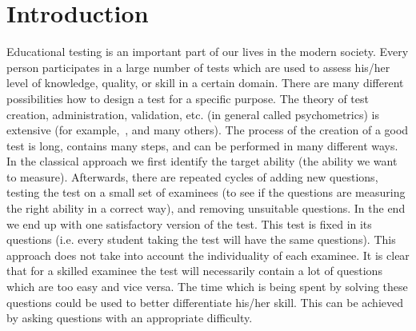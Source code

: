 \chapter*{Introduction}  
Educational testing is an important part of our lives in the modern society. Every person participates in a large number of tests which are used to assess his/her level of knowledge, quality, or skill in a certain domain. There are many different possibilities how to design a test for a specific purpose. The theory of test creation, administration, validation, etc. (in general called psychometrics) is extensive (for example,~\cite{1964psychometrics, Lord, Rasch1981, Mislevy1994}, and many others). The process of the creation of a good test is long, contains many steps, and can be performed in many different ways. In the classical approach we first identify the target ability (the ability we want to measure). Afterwards, there are repeated cycles of adding new questions, testing the test on a small set of examinees (to see if the questions are measuring the right ability in a correct way), and removing unsuitable questions. In the end we end up with one satisfactory version of the test. This test is fixed in its questions (i.e. every student taking the test will have the same questions). This approach does not take into account the individuality of each examinee. It is clear that for a skilled examinee the test will necessarily contain a lot of questions which are too easy and vice versa. The time which is being spent by solving these questions could be used to better differentiate his/her skill. This can be achieved by asking questions with an appropriate difficulty.
 
